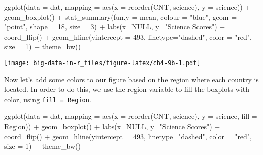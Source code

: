 \documentclass[
]{book}
\newenvironment{Shaded}{\begin{snugshade}}{\end{snugshade}}
\newcommand{\AttributeTok}[1]{\textcolor[rgb]{0.77,0.63,0.00}{#1}}
\newcommand{\ConstantTok}[1]{\textcolor[rgb]{0.00,0.00,0.00}{#1}}
\newcommand{\DecValTok}[1]{\textcolor[rgb]{0.00,0.00,0.81}{#1}}
\newcommand{\FunctionTok}[1]{\textcolor[rgb]{0.00,0.00,0.00}{#1}}
\newcommand{\NormalTok}[1]{#1}
\newcommand{\SpecialCharTok}[1]{\textcolor[rgb]{0.00,0.00,0.00}{#1}}
\newcommand{\StringTok}[1]{\textcolor[rgb]{0.31,0.60,0.02}{#1}}
\begin{document}
\begin{Shaded}
\begin{Highlighting}[]
\FunctionTok{ggplot}\NormalTok{(}\AttributeTok{data =}\NormalTok{ dat,}
       \AttributeTok{mapping =} \FunctionTok{aes}\NormalTok{(}\AttributeTok{x =} \FunctionTok{reorder}\NormalTok{(CNT, science), }\AttributeTok{y =}\NormalTok{ science)) }\SpecialCharTok{+}
  \FunctionTok{geom\_boxplot}\NormalTok{() }\SpecialCharTok{+}
  \FunctionTok{stat\_summary}\NormalTok{(}\AttributeTok{fun.y =}\NormalTok{ mean, }\AttributeTok{colour =} \StringTok{"blue"}\NormalTok{, }\AttributeTok{geom =} \StringTok{"point"}\NormalTok{, }
               \AttributeTok{shape =} \DecValTok{18}\NormalTok{, }\AttributeTok{size =} \DecValTok{3}\NormalTok{) }\SpecialCharTok{+}
  \FunctionTok{labs}\NormalTok{(}\AttributeTok{x=}\ConstantTok{NULL}\NormalTok{, }\AttributeTok{y=}\StringTok{"Science Scores"}\NormalTok{) }\SpecialCharTok{+}
  \FunctionTok{coord\_flip}\NormalTok{() }\SpecialCharTok{+}
  \FunctionTok{geom\_hline}\NormalTok{(}\AttributeTok{yintercept =} \DecValTok{493}\NormalTok{, }\AttributeTok{linetype=}\StringTok{"dashed"}\NormalTok{, }\AttributeTok{color =} \StringTok{"red"}\NormalTok{, }\AttributeTok{size =} \DecValTok{1}\NormalTok{) }\SpecialCharTok{+}
  \FunctionTok{theme\_bw}\NormalTok{()}
\end{Highlighting}
\end{Shaded}

\texttt{[image: big-data-in-r\_files/figure-latex/ch4-9b-1.pdf]}

Now let's add some colors to our figure based on the region where each country is located. In order to do this, we use the region variable to fill the boxplots with color, using \texttt{fill\ =\ Region}.

\begin{Shaded}
\begin{Highlighting}[]
\FunctionTok{ggplot}\NormalTok{(}\AttributeTok{data =}\NormalTok{ dat,}
       \AttributeTok{mapping =} \FunctionTok{aes}\NormalTok{(}\AttributeTok{x =} \FunctionTok{reorder}\NormalTok{(CNT, science), }\AttributeTok{y =}\NormalTok{ science, }\AttributeTok{fill =}\NormalTok{ Region)) }\SpecialCharTok{+}
  \FunctionTok{geom\_boxplot}\NormalTok{() }\SpecialCharTok{+}
  \FunctionTok{labs}\NormalTok{(}\AttributeTok{x=}\ConstantTok{NULL}\NormalTok{, }\AttributeTok{y=}\StringTok{"Science Scores"}\NormalTok{) }\SpecialCharTok{+}
  \FunctionTok{coord\_flip}\NormalTok{() }\SpecialCharTok{+}
  \FunctionTok{geom\_hline}\NormalTok{(}\AttributeTok{yintercept =} \DecValTok{493}\NormalTok{, }\AttributeTok{linetype=}\StringTok{"dashed"}\NormalTok{, }\AttributeTok{color =} \StringTok{"red"}\NormalTok{, }\AttributeTok{size =} \DecValTok{1}\NormalTok{) }\SpecialCharTok{+}
  \FunctionTok{theme\_bw}\NormalTok{()}
\end{Highlighting}
\end{Shaded}
\end{document}
